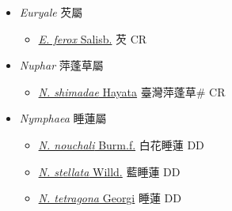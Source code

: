 
  \begin{itemize}
 \item[] \textit{Euryale} 芡屬
                    
  \begin{itemize}
        \item[] \href{http://www.theplantlist.org/tpl1.1/search?q=Euryale+ferox}{\textit{E. ferox} Salisb.}   芡 CR
  \end{itemize}
 \item[] \textit{Nuphar} 萍蓬草屬
                    
  \begin{itemize}
        \item[] \href{http://www.theplantlist.org/tpl1.1/search?q=Nuphar+shimadae}{\textit{N. shimadae} Hayata}   臺灣萍蓬草\# CR
  \end{itemize}
 \item[] \textit{Nymphaea} 睡蓮屬
                    
  \begin{itemize}
        \item[] \href{http://www.theplantlist.org/tpl1.1/search?q=Nymphaea+nouchali}{\textit{N. nouchali} Burm.f.}   白花睡蓮 DD
        \item[] \href{http://www.theplantlist.org/tpl1.1/search?q=Nymphaea+stellata}{\textit{N. stellata} Willd.}   藍睡蓮 DD
        \item[] \href{http://www.theplantlist.org/tpl1.1/search?q=Nymphaea+tetragona}{\textit{N. tetragona} Georgi}   睡蓮 DD
  \end{itemize}
  \end{itemize}
